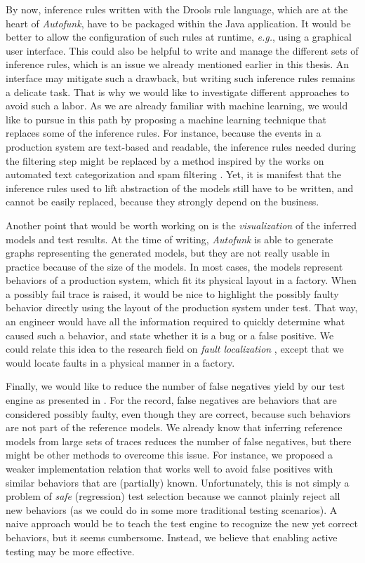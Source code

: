 By now, inference rules written with the Drools rule language,
which are at the heart of \emph{Autofunk}, have to be packaged
within the Java application. It would be better to allow the
configuration of such rules at runtime, \emph{e.g.}, using a
graphical user interface. This could also be helpful to write and
manage the different sets of inference rules, which is an issue
we already mentioned earlier in this thesis. An interface may
mitigate such a drawback, but writing such inference rules
remains a delicate task. That is why we would like to investigate
different approaches to avoid such a labor. As we are already
familiar with machine learning, we would like to pursue in this
path by proposing a machine learning technique that replaces some
of the inference rules. For instance, because the events in a
production system are text-based and readable, the inference
rules needed during the filtering step might be replaced by a
method inspired by the works on automated text categorization
\cite{Sebastiani:2002:MLA:505282.505283} and spam filtering
\cite{Guzella200910206}. Yet, it is manifest that the inference
rules used to lift abstraction of the models still have to be
written, and cannot be easily replaced, because they strongly
depend on the business.

Another point that would be worth working on is the
\emph{visualization} of the inferred models and test results. At
the time of writing, \emph{Autofunk} is able to generate graphs
representing the generated models, but they are not really usable
in practice because of the size of the models. In most cases, the
models represent behaviors of a production system, which fit its
physical layout in a factory. When a possibly fail trace is
raised, it would be nice to highlight the possibly faulty
behavior directly using the layout of the production system under
test. That way, an engineer would have all the information
required to quickly determine what caused such a behavior, and
state whether it is a bug or a false positive. We could relate
this idea to the research field on \emph{fault localization}
\cite{jones2002visualization,wong2010software}, except that we
would locate faults in a physical manner in a factory.

Finally, we would like to reduce the number of false negatives
yield by our test engine as presented in
. For the
record, false negatives are behaviors that are considered
possibly faulty, even though they are correct, because such
behaviors are not part of the reference models. We already know
that inferring reference models from large sets of traces reduces
the number of false negatives, but there might be other methods
to overcome this issue. For instance, we proposed a weaker
implementation relation that works well to avoid false positives
with similar behaviors that are (partially) known. Unfortunately,
this is not simply a problem of \emph{safe} (regression) test
selection \cite{orso2004scaling} because we cannot plainly reject
all new behaviors (as we could do in some more traditional
testing scenarios). A naive approach would be to teach the test
engine to recognize the new yet correct behaviors, but it seems
cumbersome. Instead, we believe that enabling active testing may
be more effective.

